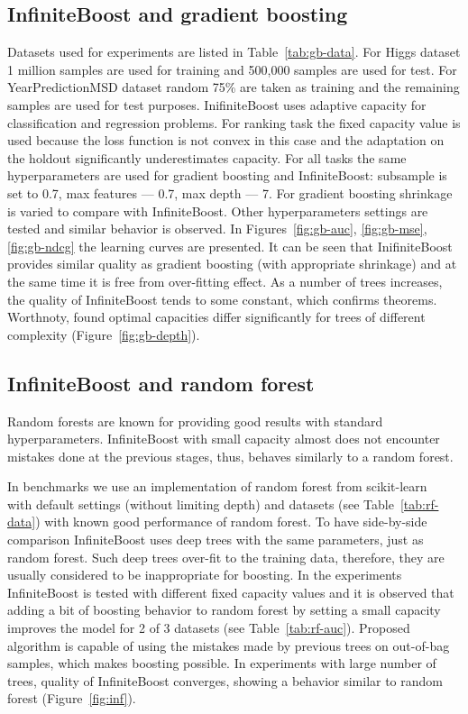 \insertplotsgbarxiv
\insertplotsforestarxiv

\subsection{InfiniteBoost and gradient boosting}
Datasets used for experiments are listed in Table~\ref{tab:gb-data}. 
For Higgs dataset 1 million samples are used for training and 500,000 samples are used for test. 
For YearPredictionMSD dataset random 75\% are taken as training and the remaining samples are used for test purposes.
InifiniteBoost uses adaptive capacity for classification and regression problems.
For ranking task the fixed capacity value is used because the loss function is not convex in this case and the adaptation on the holdout significantly underestimates capacity.
For all tasks the same hyperparameters are used for gradient boosting and InfiniteBoost: subsample is set to 0.7, max features --- 0.7, max depth --- 7. 
For gradient boosting shrinkage is varied to compare with InfiniteBoost.
Other hyperparameters settings are tested and similar behavior is observed.
In Figures~\ref{fig:gb-auc}, \ref{fig:gb-mse}, \ref{fig:gb-ndcg} the learning curves are presented.
It can be seen that InifiniteBoost provides similar quality as gradient boosting (with appropriate shrinkage) and at the same time it is free from over-fitting effect. 
As a number of trees increases, the quality of InfiniteBoost tends to some constant, which confirms theorems.
Worthnoty, found optimal capacities differ significantly for trees of different complexity (Figure~\ref{fig:gb-depth}).

\insertplotsgbnips

\subsection{InfiniteBoost and random forest}

Random forests are known for providing good results with standard hyperparameters.
InfiniteBoost with small capacity almost does not encounter mistakes done at the previous stages,
thus, behaves similarly to a random forest.

In benchmarks we use an implementation of random forest from scikit-learn~\cite{key-sklearn} with default settings (without limiting depth) and datasets (see Table~\ref{tab:rf-data}) with known good performance of random forest.
To have side-by-side comparison InfiniteBoost uses deep trees with the same parameters, just as random forest.
Such deep trees over-fit to the training data, therefore, they are usually considered to be inappropriate for boosting.
In the experiments InfiniteBoost is tested with different fixed capacity values and it is observed that adding a bit of boosting behavior to random forest by setting a small capacity improves the model for 2 of 3 datasets (see Table~\ref{tab:rf-auc}).
Proposed algorithm is capable of using the mistakes made by previous trees on out-of-bag samples, which makes boosting possible.
In experiments with large number of trees, quality of InfiniteBoost converges, showing a behavior similar to random forest (Figure~\ref{fig:inf}).

